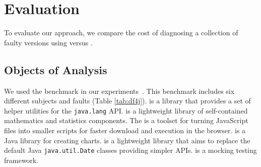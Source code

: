\documentclass{article}
\begin{document}
%
%

\section{Evaluation}
\label{sec:eval}

To evaluate our approach, we compare the cost of diagnosing
a collection of faulty versions using \sfl{} versus \comb{}.

\subsection{Objects of Analysis}\label{sec:analysis}

We used the \dfj{} benchmark in our
experiments~\cite{just-defects4j-issta2014}. This benchmark includes
six different subjects and \numFaults{} faults (Table \ref{tab:df4j}).
\lang{} is a library that provides a set of helper utilities for the
     {\small\texttt{java.lang}} API. \cmath{} is a lightweight library
     of self-contained mathematics and statistics components. The
     \closure{} is a toolset for turning JavaScript files into smaller
     scripts for faster download and execution in the
     browser. \chart{} is a Java library for creating charts. \jtime{}
     is a lightweight library that aims to replace the default Java
     {\small\texttt{java.util.Date}} classes providing simpler
     APIs. \mockito{} is a mocking testing framework.
\end{document}

